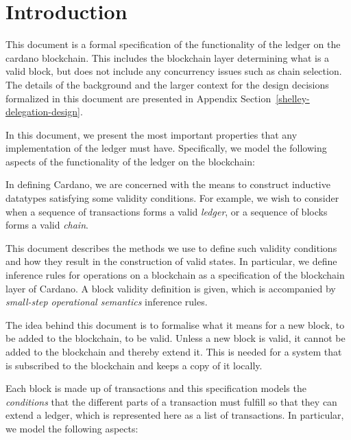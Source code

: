 
\section{Introduction}
\label{sec:introduction}

This document is a formal specification of the functionality of the \gls{ledger} on
the \Gls{cardano} \gls{blockchain}.  This includes the blockchain layer determining
what is a valid block, but does not include any concurrency issues such as chain
selection.  The details of the background and the larger context for the design
decisions formalized in this document are presented in Appendix
Section~\ref{shelley-delegation-design}.

In this document,
we present the most important properties that any implementation of the ledger must have.
Specifically, we model the following aspects
of the functionality of the ledger on the blockchain:

In defining Cardano, we are concerned with the means to construct inductive
datatypes satisfying some validity conditions. For example, we wish to consider
when a sequence of transactions forms a valid \textit{ledger}, or a sequence of
blocks forms a valid \textit{chain}.

This document describes the methods we use to define such validity
conditions and how they result in the construction of valid states.
In particular, we define inference rules for operations on a blockchain as a
specification of the blockchain layer of Cardano.
A block validity definition is given, which is accompanied by
\textit{small-step operational semantics} inference rules.

The idea behind this document is to formalise what it means for a new block, to
be added to the blockchain, to be valid.
Unless a new block is valid, it cannot be added to the blockchain and thereby
extend it.
This is needed for a system that is subscribed to the blockchain and keeps a
copy of it locally.

Each block is made up of transactions and this specification models the \textit{conditions}
that the different parts of a transaction must fulfill so that they can extend a ledger, which is
represented here as a list of transactions.  In particular, we model the following aspects:

